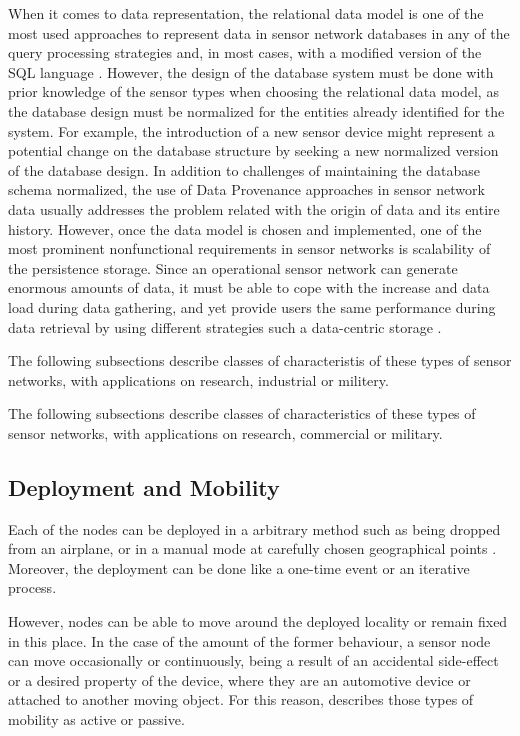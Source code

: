 When it comes to data representation, the relational data model
\cite{relational-model} is one of the most used approaches to represent data in
sensor network databases in any of the query processing strategies and, in most
cases, with a modified version of the SQL language \cite{sn-db-newop}. However,
the design of the database system must be done with prior knowledge of the
sensor types when choosing the relational data model, as the database design
must be normalized \cite{db-normalization} for the entities already identified
for the system. For example, the introduction of a new sensor device might
represent a potential change on the database structure by seeking a new
normalized version of the database design. In addition to challenges of
maintaining the database schema normalized, the use of Data Provenance
approaches in sensor network data \cite{sn-provenance} usually addresses the
problem related with the origin of data and its entire history. However, once
the data model is chosen and implemented, one of the most prominent
nonfunctional requirements in sensor networks is scalability of the persistence
storage. Since an operational sensor network can generate enormous amounts of
data, it must be able to cope with the increase and data load during data
gathering, and yet provide users the same performance during data retrieval by
using different strategies such a data-centric storage \cite{sn-storage03}.

The following subsections describe classes of characteristis of these types of
sensor networks, with applications on research, industrial or militery.

The following subsections describe classes of characteristics of these types of
sensor networks, with applications on research, commercial or military. 

\subsection{Deployment and Mobility}

Each of the nodes can be deployed in a arbitrary method
such as being dropped from an airplane, or in a manual mode at carefully chosen
geographical points \cite{sn-intro01}. Moreover, the deployment can be done like a
one-time event or an iterative process.

However, nodes can be able to move around the deployed locality or remain fixed
in this place. In the case of the amount of the former behaviour, a sensor node
can move occasionally or continuously, being a result of an accidental
side-effect or a desired property of the device, where they are an automotive
device or attached to another moving object. For this reason, \cite{sn-intro01}
describes those types of mobility as active or passive.


